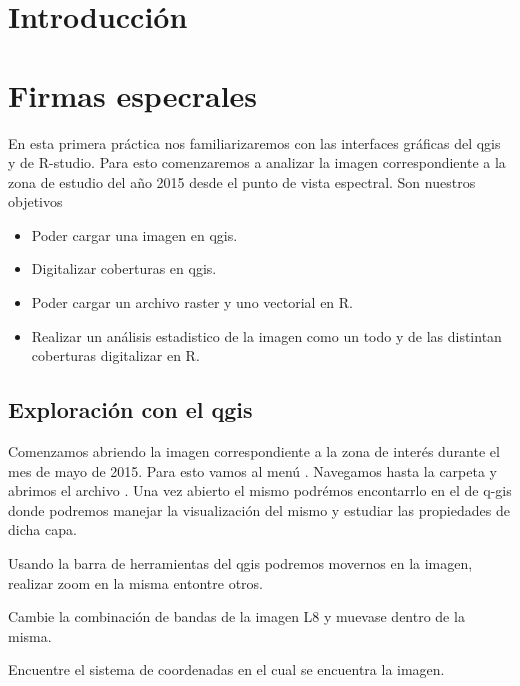 \documentclass[a4paper]{article}
\begin{document}
\section{Introducción}
\label{sec:intro}
 
\section{Firmas especrales}
\label{sec:fep}
 En esta primera práctica nos familiarizaremos con las interfaces gráficas del
 qgis y de R-studio. Para esto comenzaremos a analizar la imagen correspondiente
 a la zona de estudio del año 2015 desde el punto de vista espectral. Son
 nuestros objetivos

 \begin{itemize}
     \item Poder cargar una imagen en qgis.
     \item Digitalizar coberturas en qgis.
     \item Poder cargar un archivo raster y uno vectorial en R.
     \item Realizar un análisis estadistico de la imagen como un todo y de las
         distintan coberturas digitalizar en R.
 \end{itemize}
\subsection{Exploración con el qgis}
\label{sub:fep:qgis}

 Comenzamos abriendo la imagen  correspondiente a la zona de interés
 durante el mes de mayo de 2015. Para esto vamos al menú . Navegamos hasta la carpeta
  y abrimos el archivo
 . Una vez abierto el mismo podrémos encontarrlo en
 el  de q-gis donde podremos manejar la visualización del
 mismo y estudiar las propiedades de dicha capa.

 Usando la barra de herramientas del qgis podremos movernos en la imagen,
 realizar zoom en la misma entontre otros.

 \begin{act} 
     Cambie la combinación de bandas de la imagen L8 y muevase  dentro de la
     misma.
 \end{act}

 \begin{act}
     Encuentre el sistema de coordenadas en el cual se encuentra la imagen.
 \end{act}
 
\end{document}
